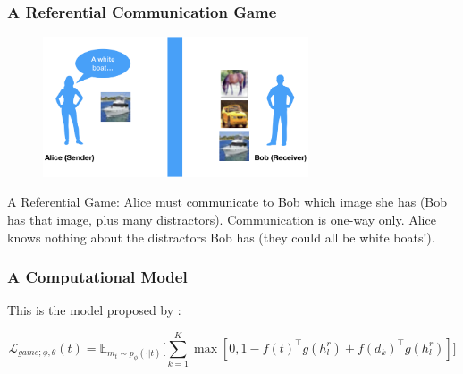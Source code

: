 \documentclass[\beamerclass,aspectratio=1610]{beamer}
\begin{document}
\begin{frame}
\frametitle{A Referential Communication Game}

\begin{figure}
\centering
\includegraphics[width=0.7\textwidth]{game.png}	
\end{figure}

A Referential Game: Alice must communicate to Bob which image she has (Bob has that image, plus many distractors). Communication is one-way only. Alice knows nothing about the distractors Bob has (they could all be white boats!).
\end{frame}

\begin{frame}
\frametitle{A Computational Model}
This is the model proposed by \citeauthor{Havrylov2017}:
\begin{figure}
    \centering
    \resizebox{0.7\textwidth}{!}{\unskip}
\end{figure}
\begin{equation*}
	\mathcal{L}_{game;\phi,\theta}(t) = \mathbb{E}_{m_t \sim p_{\phi}(\cdot | t)}\Bigg[ \sum_{k=1}^K \max[0, 1-f(t)^\top g(h_l^r) + f(d_k)^\top g(h_l^r)] \Bigg]
\end{equation*}


\end{frame}
\end{document}
